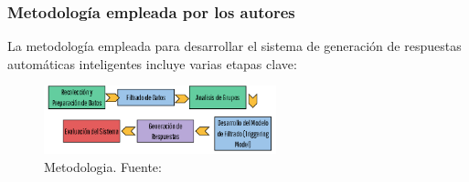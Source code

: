	\subsubsection{Metodología empleada por los autores}
		La metodología empleada para desarrollar el sistema de generación de respuestas automáticas inteligentes incluye varias etapas clave:
		\begin{figure}[H]
			\begin{center}
				\includegraphics[width=0.6\textwidth]{2/1_antecedentes/Metodologia-8.png}
				\caption{Metodologia. Fuente: \cite{Medbot-2020} }
			\end{center}
		\end{figure}
